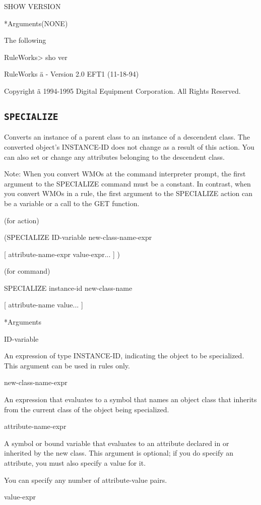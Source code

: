 {{SHOW VERSION

*Arguments(NONE)
\Example

The following

RuleWorks> sho ver

RuleWorks ä - Version 2.0 EFT1 (11-18-94)

Copyright ã 1994-1995 Digital Equipment Corporation. All
Rights Reserved.

\subsection{\tt{SPECIALIZE}}

Converts an instance of a parent class to an instance of a
descendent class. The converted object's INSTANCE-ID does not
change as a result of this action. You can also set or change
any attributes belonging to the descendent class.

Note:  When you convert WMOs at the command interpreter
prompt, the first argument to the SPECIALIZE command must be
a constant. In contrast, when you convert WMOs in a rule, the
first argument to the SPECIALIZE action can be a variable or
a call to the GET function.

\Format (for action)

(SPECIALIZE ID-variable new-class-name-expr

[ {attribute-name-expr value-expr}... ] )

\Format (for command)

SPECIALIZE instance-id new-class-name

[ {attribute-name value}... ]

*Arguments

ID-variable

An expression of type INSTANCE-ID, indicating the object to
be specialized. This argument can be used in rules only.

new-class-name-expr

An expression that evaluates to a symbol that names an object
class that inherits from the current class of the object
being specialized.

attribute-name-expr

A symbol or bound variable that evaluates to an attribute
declared in or inherited by the new class. This argument is
optional; if you do specify an attribute, you must also
specify a value for it.

You can specify any number of attribute-value pairs.

value-expr

}}
